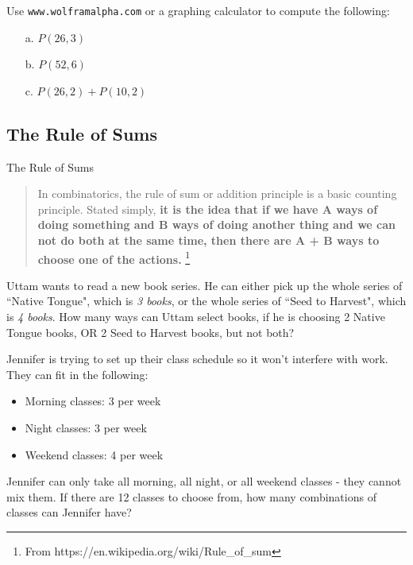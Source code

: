     \begin{questionNOGRADE}{\thequestion}
        Use \texttt{www.wolframalpha.com} or a graphing calculator to compute the following:

        \begin{enumerate}
            \item[a.]   $P(26, 3)$
            \item[b.]   $P(52, 6)$
            \item[c.]   $P(26, 2) + P(10, 2)$
        \end{enumerate}
    \end{questionNOGRADE}

    \newpage
    
    \subsection{The Rule of Sums}

    \begin{intro}{The Rule of Sums}
        \begin{quote}
            In combinatorics, the rule of sum or addition principle is a basic counting principle.
            Stated simply,
            \textbf{it is the idea that if we have A ways of doing something and B ways of doing
            another thing and we can not do both at the same time, then there are A + B ways to choose one of the actions.}
            \footnote{From https://en.wikipedia.org/wiki/Rule\_of\_sum}
        \end{quote}
    \end{intro}

    \begin{questionNOGRADE}{\thequestion}
        Uttam wants to read a new book series. He can either pick up
        the whole series of ``Native Tongue", which is \textit{3 books},
        or the whole series
        of ``Seed to Harvest", which is \textit{4 books}.
        How many ways can Uttam select books, if he is choosing 2 Native Tongue books, OR
        2 Seed to Harvest books, but not both?
    \end{questionNOGRADE}

    \hrulefill

    \begin{questionNOGRADE}{\thequestion}
        Jennifer is trying to set up their class schedule so it won't
        interfere with work. They can fit in the following:
        \begin{itemize}
            \item Morning classes: 3 per week
            \item Night classes: 3 per week
            \item Weekend classes: 4 per week
        \end{itemize}
        Jennifer can only take all morning, all night, or all weekend classes -
        they cannot mix them.
        If there are 12 classes to choose from, how many combinations of classes can Jennifer have?       
    \end{questionNOGRADE}
        
